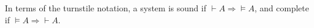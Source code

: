 

\setcounter{section}{2}
\setcounter{subsection}{1}
\setcounter{dfn}{3}


In terms of the turnstile notation, a system is sound if $\vdash A \Rightarrow  \vDash A$, and complete if $\vDash A \Rightarrow \vdash A$.




